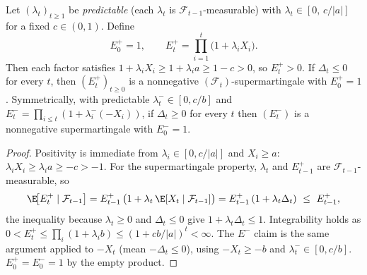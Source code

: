 \begin{lemma}\label{lem:smg}
Let $(\lambda_t)_{t\ge1}$ be \emph{predictable} (each $\lambda_t$ is
$\mathcal F_{t-1}$-measurable) with $\lambda_t\in[0,\,c/|a|]$ for a fixed
$c\in(0,1)$. Define
\[
   E_0^{+}=1,\qquad
   E_t^{+}=\prod_{i=1}^{t}\big(1+\lambda_i X_i\big).
\]
Then each factor satisfies $1+\lambda_i X_i\ge 1+\lambda_i a\ge 1-c>0$, so
$E_t^{+}>0$. If $\Delta_t\le0$ for every $t$, then $(E_t^{+})_{t\ge0}$ is a
nonnegative $(\mathcal F_t)$-supermartingale with $E_0^{+}=1$. Symmetrically, with
predictable $\lambda_t^{-}\in[0,c/b]$ and
$E_t^{-}=\prod_{i\le t}(1+\lambda_i^{-}(-X_i))$, if $\Delta_t\ge0$ for every $t$
then $(E_t^{-})$ is a nonnegative supermartingale with $E_0^{-}=1$.
\end{lemma}
\begin{proof}
Positivity is immediate from $\lambda_i\in[0,c/|a|]$ and $X_i\ge a$:
$\lambda_i X_i\ge \lambda_i a\ge -c>-1$. For the supermartingale property,
$\lambda_t$ and $E_{t-1}^{+}$ are $\mathcal F_{t-1}$-measurable, so
\[
   \E\!\big[E_t^{+}\mid\mathcal F_{t-1}\big]
   =E_{t-1}^{+}\,\big(1+\lambda_t\,\E[X_t\mid\mathcal F_{t-1}]\big)
   =E_{t-1}^{+}\,(1+\lambda_t\Delta_t)\ \le\ E_{t-1}^{+},
\]
the inequality because $\lambda_t\ge0$ and $\Delta_t\le0$ give $1+\lambda_t\Delta_t\le1$.
Integrability holds as $0<E_t^{+}\le\prod_i(1+\lambda_i b)\le(1+cb/|a|)^t<\infty$.
The $E^{-}$ claim is the same argument applied to $-X_t$ (mean $-\Delta_t\le0$),
using $-X_t\ge -b$ and $\lambda_t^{-}\in[0,c/b]$. $E_0^{+}=E_0^{-}=1$ by the empty product.
\end{proof}

